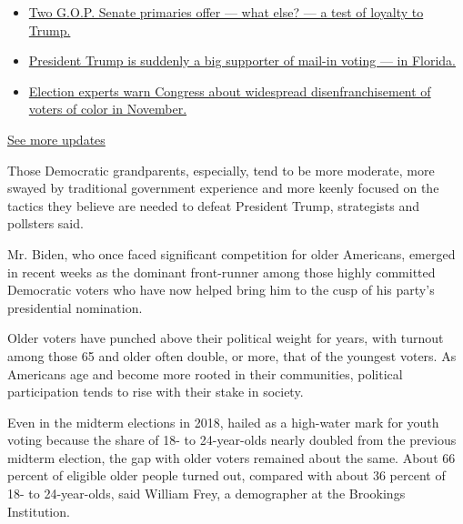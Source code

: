 \begin{itemize}
\tightlist
\item
  \href{https://www.nytimes3xbfgragh.onion/2020/08/04/us/elections/primary-election-michigan-arizona-kansas.html?action=click\&pgtype=Article\&state=default\&region=MAIN_CONTENT_1\&context=storylines_live_updates\#link-3924dd44}{Two
  G.O.P. Senate primaries offer --- what else? --- a test of loyalty to
  Trump.}
\item
  \href{https://www.nytimes3xbfgragh.onion/2020/08/04/us/elections/primary-election-michigan-arizona-kansas.html?action=click\&pgtype=Article\&state=default\&region=MAIN_CONTENT_1\&context=storylines_live_updates\#link-32b39e33}{President
  Trump is suddenly a big supporter of mail-in voting --- in Florida.}
\item
  \href{https://www.nytimes3xbfgragh.onion/2020/08/04/us/elections/primary-election-michigan-arizona-kansas.html?action=click\&pgtype=Article\&state=default\&region=MAIN_CONTENT_1\&context=storylines_live_updates\#link-6d019753}{Election
  experts warn Congress about widespread disenfranchisement of voters of
  color in November.}
\end{itemize}

\href{https://www.nytimes3xbfgragh.onion/2020/08/04/us/elections/primary-election-michigan-arizona-kansas.html?action=click\&pgtype=Article\&state=default\&region=MAIN_CONTENT_1\&context=storylines_live_updates}{See
more updates}

Those Democratic grandparents, especially, tend to be more moderate,
more swayed by traditional government experience and more keenly focused
on the tactics they believe are needed to defeat President Trump,
strategists and pollsters said.

Mr. Biden, who once faced significant competition for older Americans,
emerged in recent weeks as the dominant front-runner among those highly
committed Democratic voters who have now helped bring him to the cusp of
his party's presidential nomination.

Older voters have punched above their political weight for years, with
turnout among those 65 and older often double, or more, that of the
youngest voters. As Americans age and become more rooted in their
communities, political participation tends to rise with their stake in
society.

Even in the midterm elections in 2018, hailed as a high-water mark for
youth voting because the share of 18- to 24-year-olds nearly doubled
from the previous midterm election, the gap with older voters remained
about the same. About 66 percent of eligible older people turned out,
compared with about 36 percent of 18- to 24-year-olds, said William
Frey, a demographer at the Brookings Institution.

